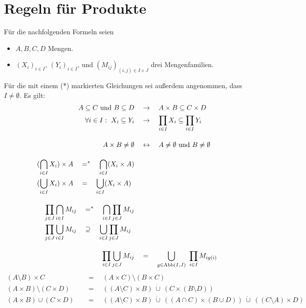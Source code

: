 \section{Regeln für Produkte}
Für die nachfolgenden Formeln seien
\begin{itemize}
    \item $A,B,C,D$ Mengen.
    \item $(X_i)_{i\in I}$, $(Y_i)_{i\in I}$, und $(M_{ij})_{(i,j)\in I\times J}$ drei Mengenfamilien.
\end{itemize}
Für die mit einem (*) markierten Gleichungen sei außerdem angenommen, dass $I\neq\emptyset$. Es gilt:
\begingroup
\allowdisplaybreaks
\begin{align*}
    A\subseteq C\ \text{und}\ B\subseteq D & \quad\to\quad A\times B\subseteq C\times D \\
    \forall i\in I:\ X_i\subseteq Y_i & \quad\to\quad \prod_{i\in I} X_i \subseteq \prod_{i\in I} Y_i \\[1em]
    A\times B \neq \emptyset & \quad \leftrightarrow\quad A\neq \emptyset \ \text{und}\ B\neq \emptyset \\[1em]
    \begin{split}
        (\bigcap_{i\in I} X_i ) \times A & \quad =^* \quad \bigcap_{i\in I} ( X_i \times A )  \\
        (\bigcup_{i\in I} X_i ) \times A & \quad = \quad \bigcup_{i\in I} ( X_i \times A)
    \end{split} \\[1em]
    \begin{split}
        \prod_{j \in J} \bigcap_{i \in I} M_{ij} & \quad =^* \quad \bigcap_{i\in I} \prod_{j\in J} M_{ij} \\
        \prod_{j \in J} \bigcup_{i\in I} M_{ij} & \quad\supseteq\quad \bigcup_{i\in I} \prod_{j\in J} M_{ij}
    \end{split} \\[1em]
    \prod_{i \in I} \bigcup_{j \in J} M_{ij} & \quad =\quad \bigcup_{g \in \Abb(I,J)}\ \prod_{i \in I} M_{ig(i)} %
\end{align*}
\begin{align*}
    (A \setminus B) \times C & \quad = \quad (A \times C) \setminus (B \times C) \\
    (A \times B) \setminus (C \times D) & \quad = \quad ((A \setminus C) \times B) \ \dot\cup\ (C \times (B \setminus D)) \\ %
    (A \times B) \cup (C \times D) & \quad = \quad ((A \setminus C) \times B)  \ \dot\cup\ ((A \cap C) \times (B \cup D)) \ \dot\cup\ ((C \setminus A) \times D) %
\end{align*}
\endgroup
 

